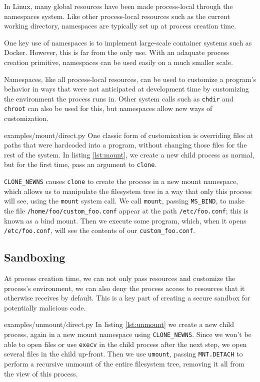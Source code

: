 \documentclass[letterpaper,twocolumn,10pt]{article}
\begin{document}
In Linux, many global resources have been made process-local
through the namespaces system.\cite{lwn_namespaces}
Like other process-local resources such as the current working directory,
namespaces are typically set up at process creation time.

One key use of namespaces is to implement large-scale container systems such as Docker.\cite{lwn_namespaces}
However, this is far from the only use.
With an adaquate process creation primitive,
namespaces can be used easily on a much smaller scale.

Namespaces, like all process-local resources,
can be used to customize a program's behavior
in ways that were not anticipated at development time
by customizing the environment the process runs in.\cite{plan9ns}
Other system calls such as \texttt{chdir} and \texttt{chroot} can also be used for this,
but namespaces allow new ways of customization.\cite{mount_namespaces}


{examples/mount/direct.py}
One classic form of customization
is overriding files at paths that were hardcoded into a program,
without changing those files for the rest of the system.
In listing \ref{lst:mount},
we create a new child process as normal,
but for the first time,
pass an argument to \texttt{clone}.

\verb|CLONE_NEWNS| causes \texttt{clone} to create the process in a new mount namespace,
which allows us to manipulate the filesystem tree in a way that only this process will see,
using the \texttt{mount} system call.\cite{mount_namespaces}\cite{clone}
We call \texttt{mount}, passing \texttt{MS\_BIND}, to make the file \verb|/home/foo/custom_foo.conf|
appear at the path \verb|/etc/foo.conf|;
this is known as a bind mount.\cite{mount}
Then we execute some program,
which, when it opens \verb|/etc/foo.conf|, will see the contents of our \verb|custom_foo.conf|.
\subsection{Sandboxing}
At process creation time,
we can not only pass resources and customize the process's environment,
we can also deny the process access to resources that it otherwise receives by default.
This is a key part of creating a secure sandbox for potentially malicious code.\cite{seccomp}\cite{firejail}\cite{gvisor}


{examples/unmount/direct.py}
In listing \ref{lst:unmount}
we create a new child process,
again in a new mount namespace using \verb|CLONE_NEWNS|.
Since we won't be able to open files or use \texttt{execv} in the child process after the next step,
we open several files in the child up-front.
Then we use \texttt{umount},
passing \texttt{MNT.DETACH} to perform a recursive unmount of the entire filesystem tree,
removing it all from the view of this process.
\end{document}
